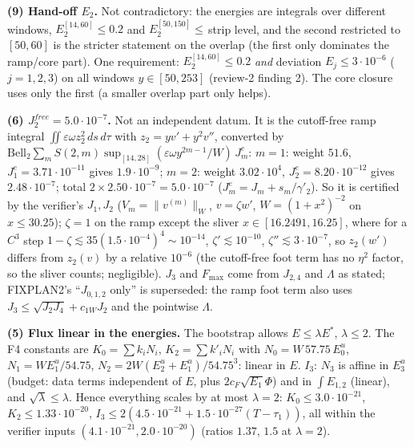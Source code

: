 \documentclass[11pt]{article}
\begin{document}
\textbf{(9) Hand-off $E_2$.} Not contradictory: the energies are integrals over different windows, $E_2^{[14,60]}\le0.2$ and $E_2^{[50,150]}\le\,$strip level, and the second restricted to $[50,60]$ is the stricter statement on the overlap (the first only dominates the ramp/core part). One requirement: $E_2^{[14,60]}\le0.2$ \emph{and} deviation $E_j\le3\cdot10^{-6}$ ($j=1,2,3$) on all windows $y\in[50,253]$ (review-2 finding 2). The core closure uses only the first (a smaller overlap part only helps).

\textbf{(6) $J_2^{free}=5.0\cdot10^{-7}$.} Not an independent datum. It is the cutoff-free ramp integral $\iint\varepsilon\omega z_2^2\,ds\,d\tau$ with $z_2=yv'+y^2v''$, converted by $\mathrm{Bell}_2\sum_mS(2,m)\sup_{[14,28]}(\varepsilon\omega y^{2m-1}/W)\,J_m^e$: $m=1$: weight $51.6$, $J_1^e=3.71\cdot10^{-11}$ gives $1.9\cdot10^{-9}$; $m=2$: weight $3.02\cdot10^4$, $J_2^e=8.20\cdot10^{-12}$ gives $2.48\cdot10^{-7}$; total $2\times2.50\cdot10^{-7}=5.0\cdot10^{-7}$ ($J_m^e=J_m+s_m/\gamma'_2$). So it is certified by the verifier's $J_1,J_2$ ($V_m=\|v^{(m)}\|_W$, $v=\zeta w'$, $W=(1+x^2)^{-2}$ on $x\le30.25$); $\zeta=1$ on the ramp except the sliver $x\in[16.2491,16.25]$, where for a $C^3$ step $1-\zeta\lesssim35(1.5\cdot10^{-4})^4\sim10^{-14}$, $\zeta'\lesssim10^{-10}$, $\zeta''\lesssim3\cdot10^{-7}$, so $z_2(w')$ differs from $z_2(v)$ by a relative $10^{-6}$ (the cutoff-free foot term has no $\eta^2$ factor, so the sliver counts; negligible). $J_3$ and $F_{\max}$ come from $J_{2,4}$ and $\Lambda$ as stated; FIXPLAN2's ``$J_{0,1,2}$ only'' is superseded: the ramp foot term also uses $J_3\le\sqrt{J_2J_4}+c_{1W}J_2$ and the pointwise $\Lambda$.

\textbf{(5) Flux linear in the energies.} The bootstrap allows $E\le\lambda E^*$, $\lambda\le2$. The F4 constants are $K_0=\sum k_iN_i$, $K_2=\sum k'_iN_i$ with $N_0=W\,57.75\,E^u_0$, $N_1=WE^u_1/54.75$, $N_2=2W(E^u_2+E^u_1)/54.75^3$: linear in $E$. $I_3$: $N_3$ is affine in $E^u_3$ (budget: data terms independent of $E$, plus $2c_F\sqrt{E_1}\Phi$) and in $\int E_{1,2}$ (linear), and $\sqrt\lambda\le\lambda$. Hence everything scales by at most $\lambda=2$: $K_0\le3.0\cdot10^{-21}$, $K_2\le1.33\cdot10^{-20}$, $I_3\le2(4.5\cdot10^{-21}+1.5\cdot10^{-27}(T-\tau_1))$, all within the verifier inputs $(4.1\cdot10^{-21},2.0\cdot10^{-20})$ (ratios $1.37$, $1.5$ at $\lambda=2$).
\end{document}
